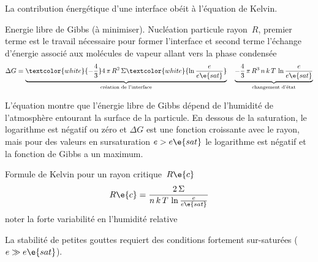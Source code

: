 \sk
La contribution énergétique d'une interface obéit à l'équation de Kelvin.

\sk
Energie libre de Gibbs (à minimiser). Nucléation particule rayon~$R$, premier terme est le travail nécessaire pour former l'interface et second terme l'échange d'énergie associé aux molécules de vapeur allant vers la phase condensée
\[ 
\Delta G = 
\underbrace{\textcolor{white}{-\frac{4}{3}} 4 \, \pi \, R^2 \, \Sigma \textcolor{white}{\ln \frac{e}{e\e{sat}}}}_{\text{création de l'interface}} 
\quad
\underbrace{- \frac{4}{3} \, \pi \, R^3 \, n \, k \, T \, \ln \frac{e}{e\e{sat}}}_{\text{changement d'état}}
\]

L'équation montre que l'énergie libre de Gibbs dépend de l'humidité de l'atmosphère entourant la surface de la particule. En dessous de la saturation, le logarithme est négatif ou zéro et $\Delta G$ est une fonction croissante avec le rayon, mais pour des valeurs en sursaturation $e>e\e{sat}$ le logarithme est négatif et la fonction de Gibbs a un maximum.

Formule de Kelvin pour un rayon critique~$R\e{c}$
\[
R\e{c} = \frac{2 \, \Sigma}{n\,k\,T\,\ln \frac{e}{e\e{sat}}}
\]
noter la forte variabilité en l'humidité relative

La stabilité de petites gouttes requiert des conditions fortement sur-saturées ($e \gg e\e{sat}$).
